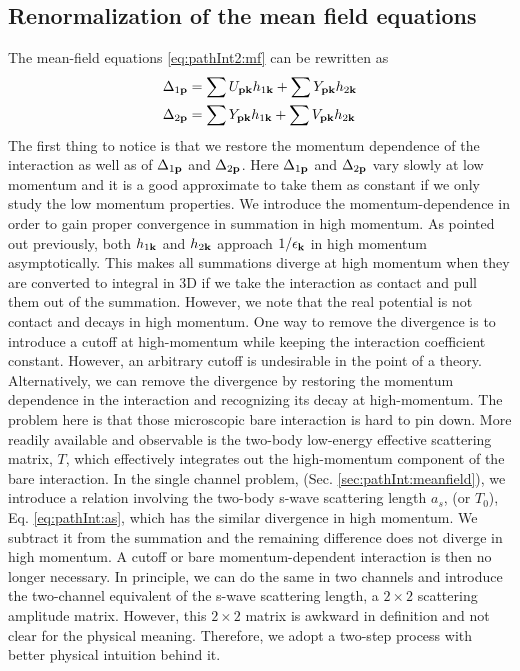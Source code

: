 \subsection {Renormalization of the mean field equations\label{sec:pathInt2:ren}}
The mean-field equations \ref{eq:pathInt2:mf} can be rewritten as 
\begin{align}
\Delta_{1\mathbf{p}}&=\sum{}U_{\mathbf{p}\mathbf{k}}h_{1\mathbf{k}}+\sum{}Y_{\mathbf{p}\mathbf{k}}h_{2\mathbf{k}}\label{eq:pathInt2:mfopen}\\
\Delta_{2\mathbf{p}}&=\sum{}Y_{\mathbf{p}\mathbf{k}}h_{1\mathbf{k}}+\sum{}V_{\mathbf{p}\mathbf{k}}h_{2\mathbf{k}}\label{eq:pathInt2:mfclose}
\end{align}
The first thing to notice is that we restore the momentum dependence of the interaction as well as of $\Delta_{1\mathbf{p}}$ and $\Delta_{2\mathbf{p}}$.     Here $\Delta_{1\mathbf{p}}$ and $\Delta_{2\mathbf{p}}$ vary slowly at low momentum and  it is a good approximate to take them as constant if we only study the low momentum properties.  We introduce the momentum-dependence in order to gain proper convergence in summation in high momentum. As pointed out previously, both $h_{1\mathbf{k}}$ and $h_{2\mathbf{k}}$ approach $1/\epsilon_{\mathbf{k}}$ in high momentum asymptotically.  This  makes  all summations diverge at high momentum when they are converted to integral in 3D if we take the interaction as contact and pull them out of the summation.  However, we note that the real potential is not contact and decays in high momentum.  One way to remove the divergence is to  introduce  a cutoff at high-momentum while keeping the interaction coefficient constant.  However, an arbitrary cutoff is  undesirable in the point of a theory.  Alternatively, we can remove the divergence by restoring the momentum dependence in the  interaction and recognizing its decay at high-momentum.    The problem here is that those microscopic bare interaction is hard to pin down.      More readily available and observable is the two-body low-energy effective scattering matrix, $T$, which effectively integrates out the high-momentum component of the bare interaction.             In the single channel problem, (Sec. \ref{sec:pathInt:meanfield}),  we  introduce a relation involving the two-body s-wave scattering length $a_{s}$, (or $T_{0}$), Eq. \eqref{eq:pathInt:as}, which has the similar divergence in high momentum.  We subtract it from the summation and the remaining difference does not diverge in high momentum.  A cutoff or bare momentum-dependent interaction is then no longer necessary.  In principle, we can do the same in two channels and introduce the two-channel equivalent of the s-wave scattering length, a $2\times2$ scattering amplitude matrix.  However, this $2\times2$ matrix is awkward in definition and not clear for the physical meaning.   Therefore, we adopt a two-step process with better physical intuition behind it.   

